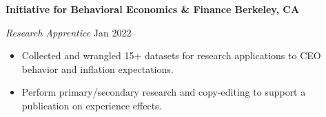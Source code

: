 \textbf{Initiative for Behavioral Economics \& Finance \hfill Berkeley, CA}\par
\textit{Research Apprentice} \hfill Jan 2022--\par
\begin{itemize}
	\item Collected and wrangled 15+ datasets for research applications to CEO behavior and inflation expectations.
	\item Perform primary/secondary research and copy-editing to support a publication on experience effects.
\end{itemize} \par
